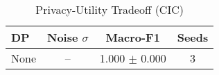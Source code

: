 \begin{table}[htbp]
\centering
\caption{Privacy-Utility Tradeoff (CIC)}\label{tab:privacy_cic}
\begin{tabular}{lccc}
\toprule
DP & Noise $\sigma$ & Macro-F1 & Seeds \\
\midrule
None & -- & 1.000 $\pm$ 0.000 & 3 \\
\bottomrule
\end{tabular}
\end{table}
